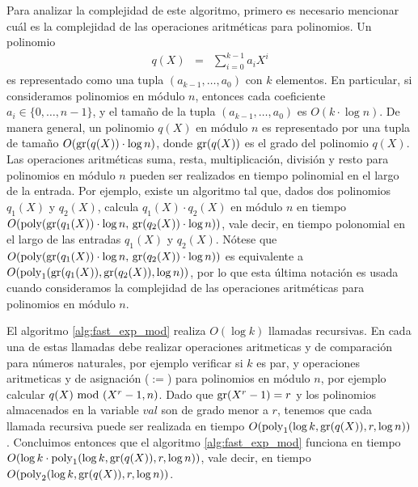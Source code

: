 Para analizar la complejidad de este algoritmo, primero es necesario mencionar cuál es la complejidad 
de las operaciones aritméticas para polinomios. Un polinomio 
\begin{eqnarray*}
q(X) & = & \sum_{i=0}^{k-1} a_i X^i
\end{eqnarray*}
es representado como una tupla $(a_{k-1}, \ldots, a_0)$ con $k$ elementos. En particular, si consideramos polinomios en módulo $n$, entonces cada coeficiente $a_i \in \{0, \ldots, n-1\}$, y el tamaño de la tupla $(a_{k-1}, \ldots, a_0)$ es $O(k \cdot \log n)$. De manera general, un polinomio $q(X)$ en módulo $n$ es representado por una tupla de tamaño $O({\rm gr}(q(X)) \cdot \log n)$, donde ${\rm gr}(q(X))$ es el grado del polinomio $q(X)$. Las operaciones aritméticas suma, resta, multiplicación, división y resto para polinomios en módulo $n$ pueden ser realizados en tiempo polinomial en el largo de la entrada. Por ejemplo, existe un algoritmo tal que, dados dos polinomios $q_1(X)$ y $q_2(X)$, calcula $q_1(X) \cdot q_2(X)$ en módulo $n$ en tiempo $O({\rm poly}({\rm gr}(q_1(X)) \cdot \log n,\, {\rm gr}(q_2(X)) \cdot \log n))$, vale decir, en tiempo polonomial en el largo de las entradas $q_1(X)$ y $q_2(X)$. Nótese que $O({\rm poly}({\rm gr}(q_1(X)) \cdot \log n,\, {\rm gr}(q_2(X)) \cdot \log n))$ es equivalente a $O({\rm poly}_1({\rm gr}(q_1(X)), {\rm gr}(q_2(X)), \log n))$, por lo que esta última notación es usada cuando consideramos la complejidad de las operaciones aritméticas para polinomios en módulo $n$. 


El algoritmo \ref{alg:fast_exp_mod} realiza $O(\log k)$ llamadas recursivas.
En cada una de estas llamadas debe realizar operaciones aritmeticas y de comparación para números naturales, por ejemplo verificar si $k$ es par, y operaciones aritmeticas y de asignación ($:=$) para polinomios en módulo $n$, por ejemplo calcular $q(X) \!\! \mod(X^r-1,n)$. Dado que ${\rm gr}(X^r - 1) = r$ y los polinomios almacenados en la variable $val$ son de grado menor a $r$, tenemos que cada llamada recursiva puede ser realizada en tiempo $O({\rm poly}_1(\log k, {\rm gr}(q(X)), r, \log n))$. Concluimos entonces que el algoritmo \ref{alg:fast_exp_mod} funciona en tiempo $O(\log k \cdot {\rm poly}_1(\log k, {\rm gr}(q(X)), r, \log n))$, vale decir, en tiempo $O({\rm poly}_2(\log k, {\rm gr}(q(X)), r, \log n))$.
